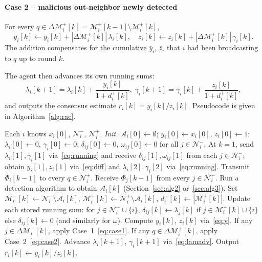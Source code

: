 \documentclass[journal]{IEEEtran}
\newcommand{\NN}{\mathcal{N}}
\newcommand{\AA}{\mathcal{A}}
\newcommand{\MM}{\mathcal{M}}
\begin{document}
\paragraph*{Case 2 -- malicious out-neighbor newly detected}
For every $q\in\Delta\MM_i^+[k] = \MM_i^+[k\!-\!1]\setminus\MM_i^+[k]$,
\begin{equation}
\label{eq:case2}
y_i[k] \leftarrow y_i[k] + |\Delta\MM_i^+[k]|\,\lambda_i[k], \quad
z_i[k] \leftarrow z_i[k] + |\Delta\MM_i^+[k]|\,\gamma_i[k].
\end{equation}
The addition compensates for the cumulative $\bar y_i$, $\bar z_i$ that $i$
had been broadcasting to $q$ up to round $k$.

The agent then advances its own running sums:
\begin{equation}
\label{eq:lamadv}
\lambda_i[k\!+\!1] = \lambda_i[k] + \frac{y_i[k]}{1+d_i^+[k]}, \;
\gamma_i[k\!+\!1] = \gamma_i[k] + \frac{z_i[k]}{1+d_i^+[k]},
\end{equation}
and outputs the consensus estimate $r_i[k]=y_i[k]/z_i[k]$.  Pseudocode is
given in Algorithm~\ref{alg:rac}.

\begin{algorithm}[t]
\caption{Resilient Average Consensus (paper Algorithm~1)}
\label{alg:rac}
\begin{algorithmic}[1]
\Require Each $i$ knows $x_i[0]$, $\NN_i^-$, $\NN_i^+$.
\State \emph{Init.} $\AA_i[0]\leftarrow\emptyset$;
       $y_i[0]\leftarrow x_i[0]$, $z_i[0]\leftarrow 1$;
       $\lambda_i[0]\leftarrow 0$, $\gamma_i[0]\leftarrow 0$;
       $\delta_{ij}[0]\!\leftarrow\!0$,
       $\omega_{ij}[0]\!\leftarrow\!0$ for all $j\in\NN_i^-$.
\State At $k=1$, send $\lambda_i[1],\gamma_i[1]$ via~\eqref{eq:running} and
       receive $\delta_{ij}[1],\omega_{ij}[1]$ from each $j\in\NN_i^-$;
       obtain $y_i[1],z_i[1]$ via~\eqref{eq:diff} and
       $\lambda_i[2],\gamma_i[2]$ via~\eqref{eq:running}.
  \State Transmit $\Phi_i[k\!-\!1]$ to every $q\in\NN_i^+$.
  \State Receive $\Phi_j[k\!-\!1]$ from every $j\in\NN_i^-$.
  \State Run a detection algorithm to obtain $\AA_i[k]$ (Section~\ref{sec:alg2}
         or~\ref{sec:alg3}).
  \State Set $\MM_i^-[k]\leftarrow\NN_i^-\setminus\AA_i[k]$,
         $\MM_i^+[k]\leftarrow\NN_i^+\setminus\AA_i[k]$,
         $d_i^+[k]\leftarrow|\MM_i^+[k]|$.
  \State Update each stored running sum: for $j\in\NN_i^-\cup\{i\}$,
         $\delta_{ij}[k]\leftarrow\lambda_j[k]$ if $j\in\MM_i^-[k]\cup\{i\}$
         else $\delta_{ij}[k]\leftarrow 0$ (and similarly for $\omega$).
  \State Compute $y_i[k]$, $z_i[k]$ via~\eqref{eq:y}.
  \State If any $j\in\Delta\MM_i^-[k]$, apply Case~1~\eqref{eq:case1}.
  \State If any $q\in\Delta\MM_i^+[k]$, apply Case~2~\eqref{eq:case2}.
  \State Advance $\lambda_i[k\!+\!1]$, $\gamma_i[k\!+\!1]$ via~\eqref{eq:lamadv}.
  \State Output $r_i[k]\leftarrow y_i[k]/z_i[k]$.
\EndFor
\end{algorithmic}
\end{algorithm}
\end{document}
